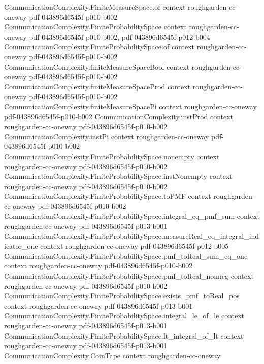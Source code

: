 \begin{theorem}
  {CommunicationComplexity.FiniteMeasureSpace.of}
  {context}
  {roughgarden-cc-oneway}
  {pdf-043896d6545f-p010-b002}
\proofstep
  {CommunicationComplexity.FiniteProbabilitySpace}
  {context}
  {roughgarden-cc-oneway}
  {pdf-043896d6545f-p010-b002,
    pdf-043896d6545f-p012-b004}
\proofstep
  {CommunicationComplexity.FiniteProbabilitySpace.of}
  {context}
  {roughgarden-cc-oneway}
  {pdf-043896d6545f-p010-b002}
\proofstep
  {CommunicationComplexity.finiteMeasureSpaceBool}
  {context}
  {roughgarden-cc-oneway}
  {pdf-043896d6545f-p010-b002}
\proofstep
  {CommunicationComplexity.finiteMeasureSpaceProd}
  {context}
  {roughgarden-cc-oneway}
  {pdf-043896d6545f-p010-b002}
\proofstep
  {CommunicationComplexity.finiteMeasureSpacePi}
  {context}
  {roughgarden-cc-oneway}
  {pdf-043896d6545f-p010-b002}
\proofstep
  {CommunicationComplexity.instProd}
  {context}
  {roughgarden-cc-oneway}
  {pdf-043896d6545f-p010-b002}
\proofstep
  {CommunicationComplexity.instPi}
  {context}
  {roughgarden-cc-oneway}
  {pdf-043896d6545f-p010-b002}
\proofstep
  {CommunicationComplexity.FiniteProbabilitySpace.nonempty}
  {context}
  {roughgarden-cc-oneway}
  {pdf-043896d6545f-p010-b002}
\proofstep
  {CommunicationComplexity.FiniteProbabilitySpace.instNonempty}
  {context}
  {roughgarden-cc-oneway}
  {pdf-043896d6545f-p010-b002}
\proofstep
  {CommunicationComplexity.FiniteProbabilitySpace.toPMF}
  {context}
  {roughgarden-cc-oneway}
  {pdf-043896d6545f-p010-b002}
\proofstep
  {CommunicationComplexity.FiniteProbabilitySpace.integral_eq_pmf_sum}
  {context}
  {roughgarden-cc-oneway}
  {pdf-043896d6545f-p013-b001}
\proofstep
  {CommunicationComplexity.FiniteProbabilitySpace.measureReal_eq_integral_indicator_one}
  {context}
  {roughgarden-cc-oneway}
  {pdf-043896d6545f-p012-b005}
\proofstep
  {CommunicationComplexity.FiniteProbabilitySpace.pmf_toReal_sum_eq_one}
  {context}
  {roughgarden-cc-oneway}
  {pdf-043896d6545f-p010-b002}
\proofstep
  {CommunicationComplexity.FiniteProbabilitySpace.pmf_toReal_nonneg}
  {context}
  {roughgarden-cc-oneway}
  {pdf-043896d6545f-p010-b002}
\proofstep
  {CommunicationComplexity.FiniteProbabilitySpace.exists_pmf_toReal_pos}
  {context}
  {roughgarden-cc-oneway}
  {pdf-043896d6545f-p013-b001}
\proofstep
  {CommunicationComplexity.FiniteProbabilitySpace.integral_le_of_le}
  {context}
  {roughgarden-cc-oneway}
  {pdf-043896d6545f-p013-b001}
\proofstep
  {CommunicationComplexity.FiniteProbabilitySpace.lt_integral_of_lt}
  {context}
  {roughgarden-cc-oneway}
  {pdf-043896d6545f-p013-b001}
\proofstep
  {CommunicationComplexity.CoinTape}
  {context}
  {roughgarden-cc-oneway}

\end{theorem}
